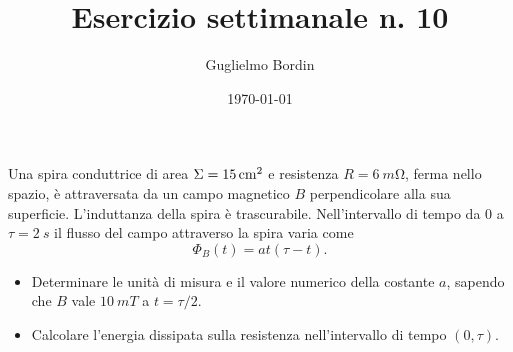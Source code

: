 \documentclass[10pt]{gulartcl}
\title{Esercizio settimanale n. 10}
\author{Guglielmo Bordin}
\date{\today}
\begin{document}
\maketitle 

\noindent
Una spira conduttrice di area $\Sigma = \qty{15}{cm\squared}$ e resistenza
$R = \qty{6}{m\ohm}$, ferma nello spazio, è attraversata da un campo
magnetico $B$ perpendicolare alla sua superficie. L’induttanza della spira
è trascurabile. Nell’intervallo di tempo da $0$ a $\tau = \qty{2}{s}$ il
flusso del campo attraverso la spira varia come
\[
     \Phi_{B}(t) = a t (\tau - t).
 \]
\begin{itemize}
    \item Determinare le unità di misura e il valore numerico della
        costante $a$, sapendo che $B$ vale $\qty{10}{mT}$ a $t = \tau / 2$.
    \item Calcolare l’energia dissipata sulla resistenza nell’intervallo di
        tempo $(0, \tau)$.
\end{itemize} 
\end{document}
